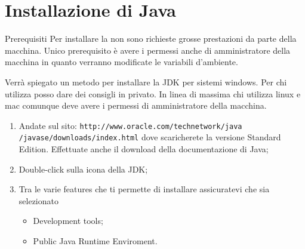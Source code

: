 \section*{Installazione di Java}
\begin{frame}
\begin{block}{Prerequisiti}
Per installare la  non sono richieste grosse prestazioni da parte della macchina.
Unico prerequisito è avere i permessi anche di amministratore della macchina in quanto verranno modificate le variabili
d'ambiente.
\end{block}
\begin{block}{}
Verrà spiegato un metodo per installare la JDK per sistemi windows. Per chi utilizza  posso dare dei 
consigli in privato. In linea di massima chi utilizza linux e mac comunque deve avere i permessi di amministratore della
macchina.
\end{block}
\end{frame}

\begin{frame}
\begin{block}{}
\begin{enumerate}
\item Andate sul sito: \texttt{\footnotesize{http://www.oracle.com/technetwork/java\\/javase/downloads/index.html}} 
dove scaricherete la versione Standard Edition. Effettuate anche il download della documentazione di Java;
\item Double-click sulla icona della JDK;
\item Tra le varie features che ti permette di installare assicuratevi che sia selezionato
\begin{itemize}
\item Development tools;
\item Public Java Runtime Enviroment.
\end{itemize}
\end{enumerate}
\end{block}
\end{frame}

